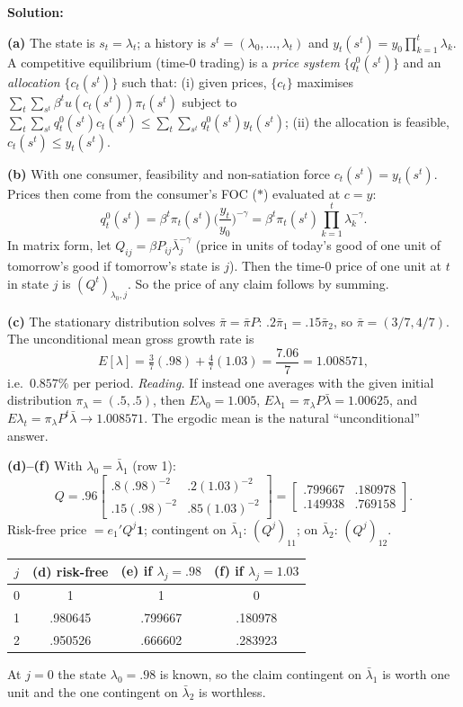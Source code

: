 \documentclass[12pt, letterpaper]{article}
\begin{document}
\begin{tcolorbox}[evenbox,title={Exercise 8.4 \quad Term structure of interest rates}]
\textbf{Solution:}

\textbf{(a)} The state is $s_t=\lambda_t$; a history is $s^t=(\lambda_0,\dots,\lambda_t)$ and $y_t(s^t)=y_0\prod_{k=1}^t\lambda_k$.
A competitive equilibrium (time-0 trading) is a \emph{price system} $\{q^0_t(s^t)\}$ and an \emph{allocation}
$\{c_t(s^t)\}$ such that: (i) given prices, $\{c_t\}$ maximises $\sum_t\sum_{s^t}\beta^tu(c_t(s^t))\pi_t(s^t)$
subject to $\sum_t\sum_{s^t}q^0_t(s^t)c_t(s^t)\le\sum_t\sum_{s^t}q^0_t(s^t)y_t(s^t)$; (ii) the allocation is
feasible, $c_t(s^t)\le y_t(s^t)$.

\textbf{(b)} With one consumer, feasibility and non-satiation force $c_t(s^t)=y_t(s^t)$. Prices then come from the
consumer's FOC ($\ast$) evaluated at $c=y$:
\[
q^0_t(s^t)=\beta^t\pi_t(s^t)\Big(\frac{y_t}{y_0}\Big)^{-\gamma}=\beta^t\pi_t(s^t)\prod_{k=1}^t\lambda_k^{-\gamma}.
\]
In matrix form, let $Q_{ij}=\beta P_{ij}\bar\lambda_j^{-\gamma}$ (price in units of today's good of one unit of
tomorrow's good if tomorrow's state is $j$). Then the time-0 price of one unit at $t$ in state $j$ is $(Q^t)_{\lambda_0,j}$.
So the price of any claim follows by summing.

\textbf{(c)} The stationary distribution solves $\bar\pi=\bar\pi P$: $.2\bar\pi_1=.15\bar\pi_2$, so
$\bar\pi=(3/7,4/7)$. The unconditional mean gross growth rate is
\[
E[\lambda]=\tfrac37(.98)+\tfrac47(1.03)=\frac{7.06}{7}=1.008571,
\]
i.e.\ $0.857\%$ per period. \emph{Reading.} If instead one averages with the given initial distribution
$\pi_\lambda=(.5,.5)$, then $E\lambda_0=1.005$, $E\lambda_1=\pi_\lambda P\bar\lambda=1.00625$, and
$E\lambda_t=\pi_\lambda P^t\bar\lambda\to1.008571$. The ergodic mean is the natural ``unconditional'' answer.

\textbf{(d)--(f)} With $\lambda_0=\bar\lambda_1$ (row 1):
\[
Q=.96\begin{bmatrix}.8(.98)^{-2}&.2(1.03)^{-2}\\.15(.98)^{-2}&.85(1.03)^{-2}\end{bmatrix}
=\begin{bmatrix}.799667&.180978\\.149938&.769158\end{bmatrix}.
\]
Risk-free price $=e_1'Q^j\mathbf 1$; contingent on $\bar\lambda_1$: $(Q^j)_{11}$; on $\bar\lambda_2$: $(Q^j)_{12}$.
\begin{center}
\begin{tabular}{@{}cccc@{}}
\toprule
$j$ & (d) risk-free & (e) if $\lambda_j=.98$ & (f) if $\lambda_j=1.03$\\
\midrule
0 & 1 & 1 & 0\\
1 & .980645 & .799667 & .180978\\
2 & .950526 & .666602 & .283923\\
\bottomrule
\end{tabular}
\end{center}
At $j=0$ the state $\lambda_0=.98$ is known, so the claim contingent on $\bar\lambda_1$ is worth one unit and the one
contingent on $\bar\lambda_2$ is worthless.


\end{tcolorbox}
\end{document}
